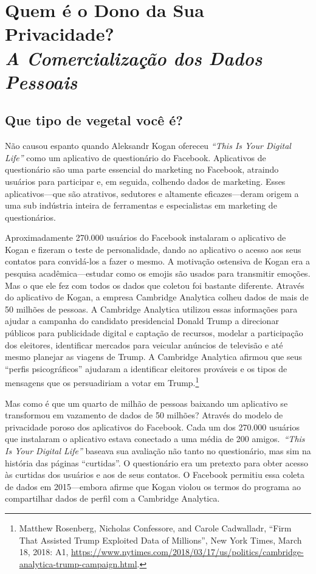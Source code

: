 \documentclass{book}
\newcommand{\ingles}[1]{\textit{#1}}
\begin{document}
\chapter[Quem é o Dono da Sua Privacidade?]{Quem é o Dono da Sua Privacidade?\\\large\textit{A Comercialização dos Dados Pessoais}}
\label{cap3:quem}

\section{Que tipo de vegetal você é?}
\label{cap3:quem-que}
Não causou espanto quando Aleksandr Kogan ofereceu \ingles{``This Is Your Digital Life''}
como um aplicativo de questionário do Facebook. Aplicativos de questionário são
uma parte essencial do marketing no Facebook, atraindo usuários para participar
e, em seguida, colhendo dados de marketing. Esses aplicativos---que são atrativos,
sedutores e altamente eficazes---deram origem a uma sub indústria inteira de
ferramentas e especialistas em marketing de questionários.

Aproximadamente 270.000 usuários do Facebook instalaram o aplicativo de Kogan e
fizeram o teste de personalidade, dando ao aplicativo o acesso aos seus
contatos para convidá-los a fazer o mesmo. A motivação ostensiva de Kogan era a
pesquisa acadêmica---estudar como os emojis são usados para transmitir emoções.
Mas o que ele fez com todos os dados que coletou foi bastante diferente.
Através do aplicativo de Kogan, a empresa Cambridge Analytica colheu dados de
mais de 50 milhões de pessoas. A Cambridge Analytica utilizou essas informações
para ajudar a campanha do candidato presidencial Donald Trump a direcionar
públicos para publicidade digital e captação de recursos, modelar a
participação dos eleitores, identificar mercados para veicular anúncios de
televisão e até mesmo planejar as viagens de Trump. A Cambridge Analytica
afirmou que seus ``perfis psicográficos'' ajudaram a identificar eleitores
prováveis e os tipos de mensagens que os persuadiriam a votar em
Trump.\footnote{Matthew Rosenberg, Nicholas Confessore, and Carole Cadwalladr,
``Firm That Assisted Trump Exploited Data of Millions'', New York Times, March
18, 2018: A1,
\url{https://www.nytimes.com/2018/03/17/us/politics/cambridge-analytica-trump-campaign.html}.}

Mas como é que um quarto de milhão de pessoas baixando um aplicativo se
transformou em vazamento de dados de 50 milhões? Através do modelo de
privacidade poroso dos aplicativos do Facebook. Cada um dos 270.000 usuários
que instalaram o aplicativo estava conectado a uma média de 200
amigos.~\ingles{``This Is Your Digital Life''} baseava sua avaliação não tanto
no questionário, mas sim na história das páginas ``curtidas''. O questionário
era um pretexto para obter acesso às curtidas dos usuários e aos de seus
contatos. O Facebook permitiu essa coleta de dados em 2015---embora afirme que
Kogan violou os termos do programa ao compartilhar dados de perfil com a
Cambridge Analytica.
\end{document}
